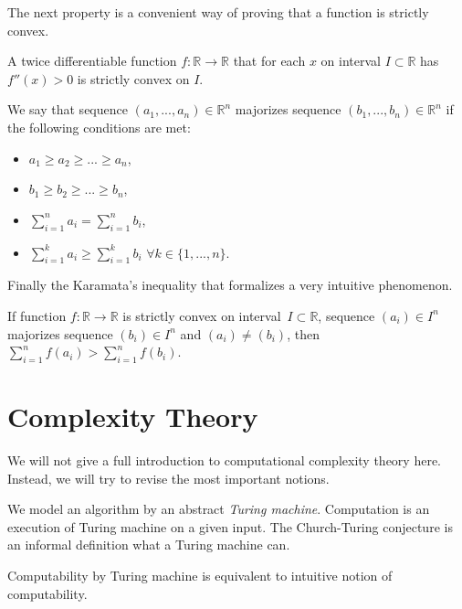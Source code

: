 The next property is a convenient way of proving that a function is strictly convex.

\begin{prp}
A twice differentiable function $f:\mathbb{R}\rightarrow\mathbb{R}$
that for each $x$ on interval $I \subset \mathbb{R}$ has $f''(x) > 0$
is strictly convex on $I$.
\end{prp}

\begin{defn}[majorization]
We say that sequence $(a_1, ..., a_n) \in \mathbb{R}^n$ majorizes sequence $(b_1, ..., b_n) \in \mathbb{R}^n$
if the following conditions are met:
\begin{itemize}
	\item $a_1 \geq a_2 \geq ... \geq a_n$,
	\item $b_1 \geq b_2 \geq ... \geq b_n$,
	\item $\sum_{i=1}^n a_i = \sum_{i=1}^n b_i$,
	\item $\sum_{i=1}^k a_i \geq \sum_{i=1}^k b_i$ $\forall k \in \{ 1, ..., n\}$.
\end{itemize}
\end{defn}

Finally the Karamata's inequality that formalizes a very intuitive phenomenon.

\begin{thm} \label{thm:Kar}
If function $f:\mathbb{R}\rightarrow\mathbb{R}$ is strictly convex on interval~$I \subset \mathbb{R}$,
sequence $(a_i) \in I^n$ majorizes sequence $(b_i) \in I^n$ and $(a_i) \neq (b_i)$, then
$\sum_{i=1}^n f(a_i) > \sum_{i=1}^n f(b_i)$.
\end{thm}


\section{Complexity Theory}

We will not give a full introduction to computational complexity theory here.
Instead, we will try to revise the most important notions.

We model an algorithm by an abstract \textit{Turing machine}.
Computation is an execution of Turing machine on a given input.
The Church-Turing conjecture is an informal definition what a Turing machine can.

\begin{thm}
Computability by Turing machine is equivalent to intuitive notion of computability.
\end{thm}


